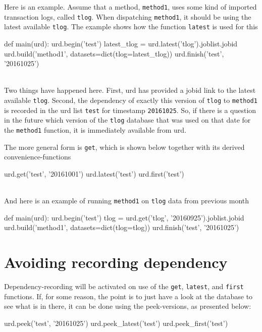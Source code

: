 Here is an example.  Assume that a method, \texttt{method1}, uses some
kind of imported transaction logs, called \texttt{tlog}.  When
dispatching \texttt{method1}, it should be using the latest available
\texttt{tlog}.  The example shows how the function \texttt{latest} is
used for this
\\
\begin{python}
def main(urd):
  urd.begin('test')
  latest_tlog = urd.latest('tlog').joblist.jobid
  urd.build('method1', datasets=dict(tlog=latest_tlog))
  urd.finish('test', '20161025')
\end{python}
\\
Two things have happened here.  First, urd has provided a jobid link
to the latest available \texttt{tlog}.  Second, the dependency of
exactly this version of \texttt{tlog} to \texttt{method1} is recorded
in the urd list \texttt{test} for timestamp \texttt{20161025}.  So, if
there is a question in the future which version of the \texttt{tlog}
database that was used on that date for the \texttt{method1} function,
it is immediately available from urd.

The more general form is \texttt{get}, which is shown below together
with its derived convenience-functions
\\
\begin{python}
  urd.get('test', '20161001')
  urd.latest('test')
  urd.first('test')
\end{python}
\\
And here is an example of running \texttt{method1} on \texttt{tlog} data
from previous month
\\
\begin{python}
def main(urd):
  urd.begin('test')
  tlog = urd.get('tlog', '20160925').joblist.jobid
  urd.build('method1', datasets=dict(tlog=tlog))
  urd.finish('test', '20161025')
\end{python}



\section{Avoiding recording dependency}
Dependency-recording will be activated on use of the \texttt{get},
\texttt{latest}, and \texttt{first} functions.  If, for some reason,
the point is to just have a look at the database to see what is in
there, it can be done using the peek-versions, as presented below:
\\
\begin{python}
  urd.peek('test', '20161025')
  urd.peek_latest('test')
  urd.peek_first('test')
\end{python}



